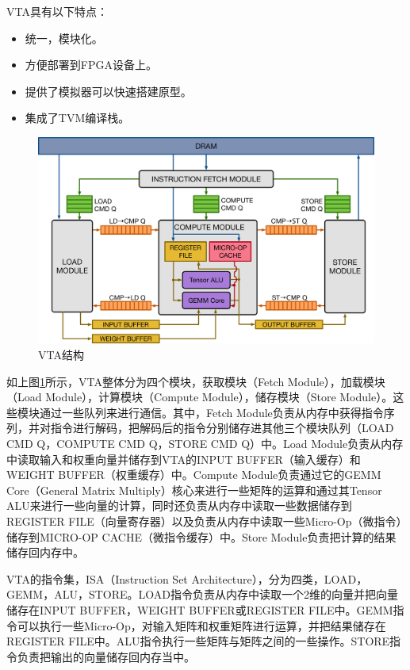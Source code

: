 VTA具有以下特点：
\begin{itemize}
    \item {统一，模块化。}
    \item {方便部署到FPGA设备上。}
    \item {提供了模拟器可以快速搭建原型。}
    \item {集成了TVM编译栈。}
\end{itemize}

\begin{figure}[h!]
    \centering
    \includegraphics[width=180bp]{figure/vta_overview.png}
    \caption{VTA结构}
    \label{vta}
\end{figure}

如上图\ref{vta}所示，VTA整体分为四个模块，获取模块（Fetch Module），加载模块（Load Module），计算模块（Compute Module），储存模块（Store Module）。这些模块通过一些队列来进行通信。其中，Fetch Module负责从内存中获得指令序列，并对指令进行解码，把解码后的指令分别储存进其他三个模块队列（LOAD CMD Q，COMPUTE CMD Q，STORE CMD Q）中。Load Module负责从内存中读取输入和权重向量并储存到VTA的INPUT BUFFER（输入缓存）和WEIGHT BUFFER（权重缓存）中。Compute Module负责通过它的GEMM Core（General Matrix Multiply）核心来进行一些矩阵的运算和通过其Tensor ALU来进行一些向量的计算，同时还负责从内存中读取一些数据储存到REGISTER FILE（向量寄存器）以及负责从内存中读取一些Micro-Op（微指令）储存到MICRO-OP CACHE（微指令缓存）中。Store Module负责把计算的结果储存回内存中。

VTA的指令集，ISA（Instruction Set Architecture），分为四类，LOAD，GEMM，ALU，STORE。LOAD指令负责从内存中读取一个2维的向量并把向量储存在INPUT BUFFER，WEIGHT BUFFER或REGISTER FILE中。GEMM指令可以执行一些Micro-Op，对输入矩阵和权重矩阵进行运算，并把结果储存在REGISTER FILE中。ALU指令执行一些矩阵与矩阵之间的一些操作。STORE指令负责把输出的向量储存回内存当中。